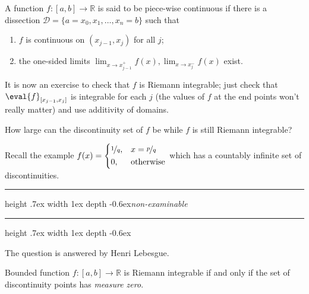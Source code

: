 \begin{definition}
    A function \(f:[a,b] \to \mathbb{R}\) is said to be piece-wise continuous if there is a dissection \(\mathcal{D} = \{a = x_0, x_1,\dots, x_n = b\}\) such that
    \begin{enumerate}
        \item \(f\) is continuous on \((x_{j-1}, x_j)\) for all \(j\);
        \item the one-sided limits \(\lim_{x \to x_{j-1}^+} f(x), \lim_{x\to x_j^-}f(x)\) exist.
    \end{enumerate}
\end{definition}
It is now an exercise to check that \(f\) is Riemann integrable; just check that \(\eval{f}_{[x_{j-1},x_j]}\) is integrable for each \(j\) (the values of \(f\) at the end points won't really matter) and use additivity of domains.
\begin{problem}
    How large can the discontinuity set of \(f\) be while \(f\) is still Riemann integrable?
\end{problem}
Recall the example \(f(x) = \begin{dcases}
    \nicefrac{1}{q}, &x = \nicefrac{p}{q} \\
    0, &\text{otherwise} \\
\end{dcases}\) which has a countably infinite set of discontinuities.
\def\dotfill#1{\cleaders\hbox to #1{.}\hfill}
\makeatletter
\def\myrulefill{\leavevmode\leaders\hrule height .7ex width 1ex depth -0.6ex\hfill\kern\z@}
\makeatother

\noindent\myrulefill\textit{non-examinable}\myrulefill

The question is answered by Henri Lebesgue.

Bounded function \(f: [a,b] \to \mathbb{R}\) is Riemann integrable if and only if the set of discontinuity points has \textit{measure zero}.

